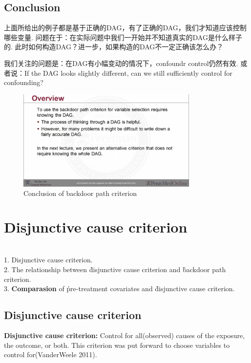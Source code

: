 \subsection{Conclusion}
上面所给出的例子都是基于正确的DAG，有了正确的DAG，我们才知道应该控制哪些变量. 问题在于：在实际问题中我们一开始并不知道真实的DAG是什么样子的. 此时如何构造DAG？进一步，如果构造的DAG不一定正确该怎么办？

我们关注的问题是：在DAG有小幅变动的情况下，confoundr control仍然有效. 或者说：If the DAG looks slightly different, can we still sufficiently control for confounding? 
\begin{figure}[htbp]
	\setlength{\abovecaptionskip}{0pt}     %
	\setlength{\belowcaptionskip}{10pt}
	\vspace{-0cm}  %
	\setlength{\abovecaptionskip}{-0cm}   %
	\setlength{\belowcaptionskip}{-0cm}   %
	\centering
	\includegraphics[width=0.8\textwidth]{figure/conclusionbdc.jpg}
	\caption{Conclusion of backdoor path criterion}
	\label{conclusionbdc}
\end{figure}

\section{Disjunctive cause criterion}
\\
1. Disjunctive cause criterion. \\
2. The relationship between \r{disjunctive cause criterion} and \r{backdoor path criterion.} \\
3. {\bfseries Comparasion} of \r{pre-treatment covariates} and \r{disjunctive cause criterion.}

\subsection{Disjunctive cause criterion}
{\bfseries Disjunctive cause criterion: } Control for all(observed) causes of the exposure, the outcome, or both. This criterion was put forward to choose variables to control for(VanderWeele 2011).


